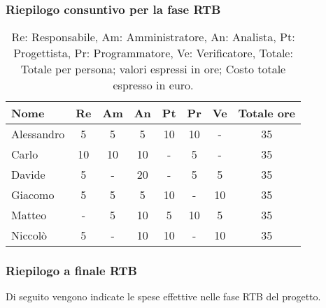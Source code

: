 \subsubsection{Riepilogo consuntivo per la fase RTB}

\begin{table}[H]
	\centering
	\begin{tabular}{l|c|c|c|c|c|c|c}
		\textbf{Nome} & \textbf{Re} & \textbf{Am} & \textbf{An} & \textbf{Pt} & \textbf{Pr} & \textbf{Ve} & \textbf{Totale ore} \\
		\hline
		Alessandro    & 5           & 5           & 5           & 10          & 10          & -           & 35                  \\
		Carlo         & 10          & 10          & 10          & -           & 5           & -           & 35                  \\
		Davide        & 5           & -           & 20          & -           & 5           & 5           & 35                  \\
		Giacomo       & 5           & 5           & 5           & 10          & -           & 10          & 35                  \\
		Matteo        & -           & 5           & 10          & 5           & 10          & 5           & 35                  \\
		Niccolò       & 5           & -           & 10          & 10          & -           & 10          & 35                  \\
		\hline
	\end{tabular}
	\caption{Re: Responsabile, Am: Amministratore, An: Analista, Pt: Progettista,
		Pr: Programmatore, Ve: Verificatore, Totale: Totale per persona; valori espressi in ore; Costo totale espresso in euro.}
\end{table}






\subsubsection{Riepilogo a finale RTB}

Di seguito vengono indicate le spese effettive nelle fase RTB del progetto.

